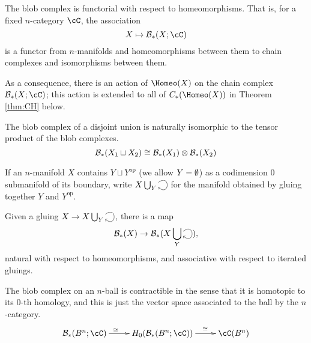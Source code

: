 \documentclass{pnastwo}
\begin{document}
\begin{article}
\begin{property}[Functoriality]
\label{property:functoriality}%
The blob complex is functorial with respect to homeomorphisms.
That is, 
for a fixed $n$-category $\cC$, the association
\begin{equation*}
X \mapsto \bc_*(X; \cC)
\end{equation*}
is a functor from $n$-manifolds and homeomorphisms between them to chain 
complexes and isomorphisms between them.
\end{property}
As a consequence, there is an action of $\Homeo(X)$ on the chain complex $\bc_*(X; \cC)$; 
this action is extended to all of $C_*(\Homeo(X))$ in Theorem \ref{thm:CH} below.

\begin{property}
\label{property:disjoint-union}
The blob complex of a disjoint union is naturally isomorphic to the tensor product of the blob complexes.
\begin{equation*}
{\mathcal B}_*(X_1 \sqcup X_2) \cong {\mathcal B}_*(X_1) \otimes {\mathcal B}_*(X_2)
\end{equation*}
\end{property}

If an $n$-manifold $X$ contains $Y \sqcup Y^\text{op}$ (we allow $Y = \emptyset$) as a codimension $0$ submanifold of its boundary, 
write $X \bigcup_{Y}\selfarrow$ for the manifold obtained by gluing together $Y$ and $Y^\text{op}$.
\begin{property}
\label{property:gluing-map}%
Given a gluing $X \to X \bigcup_{Y}\selfarrow$, there is
a map
\[
	\bc_*(X) \to \bc_*(X \bigcup_{Y}\selfarrow),
\]
natural with respect to homeomorphisms, and associative with respect to iterated gluings.
\end{property}

\begin{property}[Contractibility]
\label{property:contractibility}%
The blob complex on an $n$-ball is contractible in the sense 
that it is homotopic to its $0$-th homology, and this is just the vector space associated to the ball by the $n$-category.
\begin{equation*}
\xymatrix{\bc_*(B^n;\cC) \ar[r]^(0.4){\htpy} & H_0(\bc_*(B^n;\cC)) \ar[r]^(0.6)\iso & \cC(B^n)}
\end{equation*}
\end{property}


\end{article}
\end{document}
